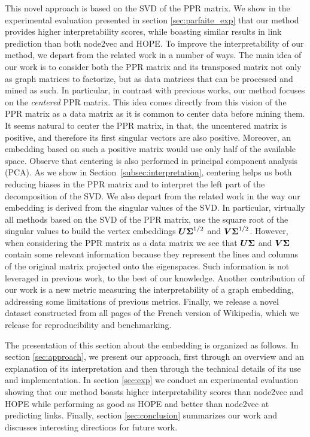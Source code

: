This novel approach is based on the SVD of the PPR matrix. We show in the experimental evaluation presented in section \ref{sec:parfaite_exp} that our method provides higher interpretability scores, while boasting similar results in link prediction than both node2vec and HOPE. To improve the interpretability of our method, we depart from the related work in a number of ways. The main idea of our work is to consider both the PPR matrix and its transposed matrix not only as graph matrices to factorize, but as data matrices that can be processed and mined as such. In particular, in contrast with previous works, our method focuses on the \textit{centered} PPR matrix. This idea comes directly from this vision of the PPR matrix as a data matrix as it is common to center data before mining them. It seems natural to center the PPR matrix, in that, the uncentered matrix is positive, and therefore its first singular vectors are also positive. Moreover, an embedding based on such a positive matrix would use only half of the available space. Observe that centering is also performed in principal component analysis (PCA). As we show in Section~\ref{subsec:interpretation}, centering helps us both reducing biases in the PPR matrix and to interpret the left part of the decomposition of the SVD. We also depart from the related work in the way our embedding is derived from the singular values of the SVD. In particular, virtually all methods based on the SVD of the PPR matrix, use the square root of the singular values to build the vertex embeddings $\boldsymbol{U}\boldsymbol{\Sigma}^{1/2}$ and $\boldsymbol{V}\boldsymbol{\Sigma}^{1/2}$. However, when considering the PPR matrix as a data matrix we see that $\boldsymbol{U}\boldsymbol{\Sigma}$ and $\boldsymbol{V}\boldsymbol{\Sigma}$ contain some relevant information because they represent the lines and columns of the original matrix projected onto the eigenspaces. Such information is not leveraged in previous work, to the best of our knowledge.  Another contribution of our work is a new metric measuring the interpretability of a graph embedding, addressing some limitations of previous metrics. Finally, we release a novel dataset constructed from all pages of the French version of Wikipedia, which we release for reproducibility and benchmarking.

The presentation of this section about the \parfaite{} embedding is organized as follows. In section \ref{sec:approach}, we present our approach, first through an overview and an explanation of its interpretation and then through the technical details of its use and implementation. 
In section \ref{sec:exp} we conduct an experimental evaluation showing that our method boasts higher interpretability scores than node2vec and HOPE while performing as good as HOPE and better than node2vec at predicting links.
Finally, section \ref{sec:conclusion} summarizes our work and discusses interesting directions for future work.


